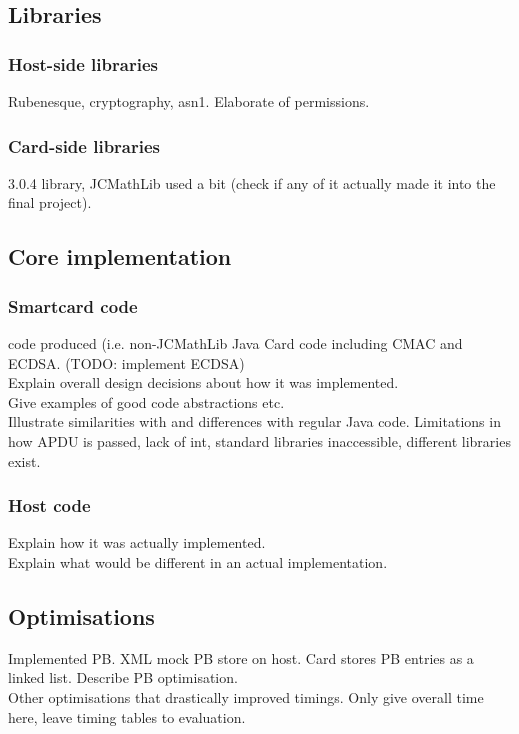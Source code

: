 \documentclass[12pt]{article}
\begin{document}
\subsection{Libraries}
\subsubsection{Host-side libraries}
Rubenesque, cryptography, asn1. Elaborate of permissions.
\subsubsection{Card-side libraries}
3.0.4 library, JCMathLib used a bit (check if any of it actually made it into the final project).

\subsection{Core implementation}
\subsubsection{Smartcard code}
code produced (i.e. non-JCMathLib Java Card code including CMAC and ECDSA. (TODO: implement ECDSA)\\
Explain overall design decisions about how it was implemented.\\
Give examples of good code abstractions etc.\\

Illustrate similarities with and differences with regular Java code. Limitations in how APDU is passed, lack of int, standard libraries inaccessible, different libraries exist.

\subsubsection{Host code}
Explain how it was actually implemented.\\
Explain what would be different in an actual implementation.\\


\subsection{Optimisations}
Implemented PB. XML mock PB store on host. Card stores PB entries as a linked list. Describe PB optimisation.\\

Other optimisations that drastically improved timings. Only give overall time here, leave timing tables to evaluation.
\end{document}
